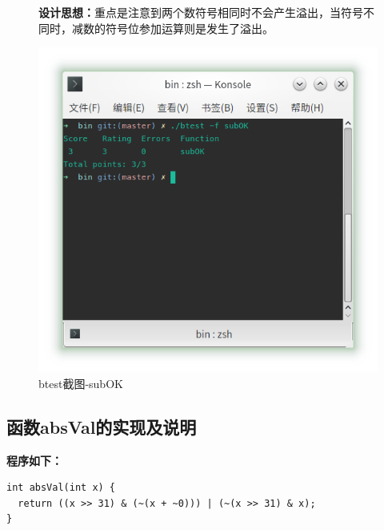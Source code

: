 \begin{figure}[H]
    \begin{minipage}[c]{0.5\linewidth}
        \textbf{设计思想：}重点是注意到两个数符号相同时不会产生溢出，当符号不同时，减数的符号位参加运算则是发生了溢出。
    \end{minipage}
    \begin{minipage}[c]{0.4\linewidth}
        \centering
        \includegraphics[width=0.9\linewidth]{figures/subOK}
        \caption{btest截图-subOK}
        \label{fig:subOK}
    \end{minipage}
\end{figure}

\subsection{函数absVal的实现及说明}
\textbf{程序如下：}

\begin{verbatim}
int absVal(int x) {
  return ((x >> 31) & (~(x + ~0))) | (~(x >> 31) & x);
}
\end{verbatim}

